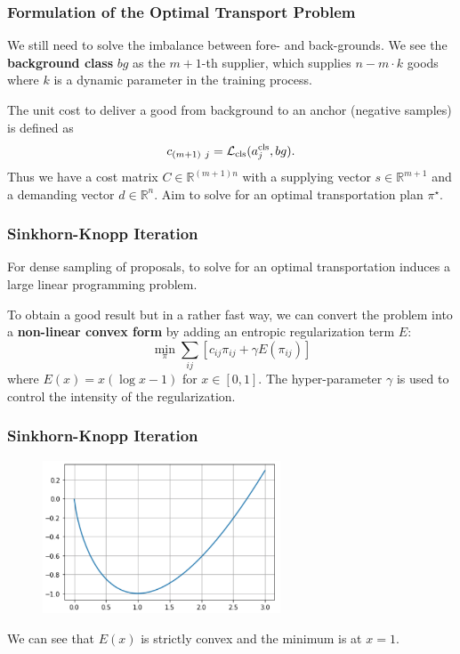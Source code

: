 \documentclass[slidetop, mathserif, dvipsnames]{beamer}
\begin{document}
\begin{frame}
    \frametitle{Formulation of the Optimal Transport Problem}

    We still need to solve the imbalance between fore- and back-grounds.
    We see the {\bf background class} $bg$ as the $m+1$-th supplier, which supplies
    $n-m\cdot k$ goods where $k$ is a dynamic parameter in the training process.

    \quad

    The unit cost to deliver a good from background to an anchor (negative samples)
    is defined as
    \[
        c_{(m+1)~j} = \mathcal L_{\rm cls}(a_j^{\rm cls}, bg).
    \]
    Thus we have a cost matrix $C\in\mathbb R^{(m+1)n}$ with a supplying vector
    $s\in\mathbb R^{m+1}$ and a demanding vector $d\in\mathbb R^n$.
    Aim to solve for an optimal transportation plan $\pi^\star$.

\end{frame}

\begin{frame}
    \frametitle{Sinkhorn-Knopp Iteration}

    For dense sampling of proposals, to solve for an optimal transportation
    induces a large linear programming problem.

    \quad

    To obtain a good result but in a rather fast way,
    we can convert the problem into a {\bf non-linear convex form}
    by adding an entropic regularization term $E$:
    \[
        \min_{\pi} \sum_{ij} \left[c_{ij}\pi_{ij} + \gamma E(\pi_{ij})\right]
    \]
    where $E(x) = x(\log x-1)$ for $x \in [0,1]$.
    The hyper-parameter $\gamma$ is used to control the intensity
    of the regularization.

\end{frame}

\begin{frame}
    \frametitle{Sinkhorn-Knopp Iteration}

    \begin{figure}
        \includegraphics[width=200pt]{pics/ota_entropic_regularization.png}
    \end{figure}

    We can see that $E(x)$ is strictly convex and
    the minimum is at $x=1$.

\end{frame}
\end{document}
